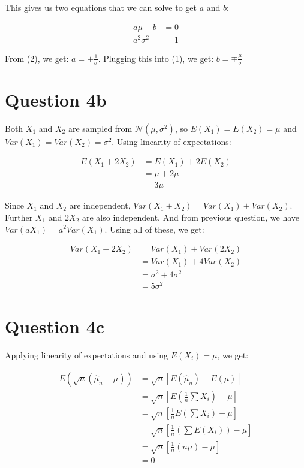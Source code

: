 \documentclass{article}
\begin{document}
    This gives us two equations that we can solve to get $a$ and $b$:

    \begin{align}
        a \mu + b           &= 0 \\
        a^{2} \sigma^{2}    &= 1
    \end{align}

    From (2), we get: $a = \pm \frac{1}{\sigma}$. Plugging this into (1), we get: $b = \mp \frac{\mu}{\sigma}$

    \section*{Question 4b}

    Both $X_1$ and $X_2$ are sampled from $\mathcal{N}(\mu, \sigma^{2})$, so $E(X_1) = E(X_2) = \mu$ and $Var(X_1) = Var(X_2) = \sigma^{2}$. Using linearity of expectations:

    \begin{align*}
        E(X_1 + 2X_2)   &= E(X_1) + 2E(X_2) \\
                        &= \mu + 2 \mu \\
                        &= 3 \mu
    \end{align*}

    Since $X_1$ and $X_2$ are independent, $Var(X_1 + X_2) = Var(X_1) + Var(X_2)$. Further $X_1$ and $2X_2$ are also independent. And from previous question, we have $Var(aX_1) = a^{2}Var(X_1)$. Using all of these, we get:

    \begin{align*}
        Var(X_1 + 2X_2) &= Var(X_1) + Var(2X_2) \\
                        &= Var(X_1) + 4Var(X_2) \\
                        &= \sigma^{2} + 4\sigma^{2} \\
                        &= 5\sigma^{2}
    \end{align*}

    \section*{Question 4c}

    Applying linearity of expectations and using $E(X_i) = \mu$, we get:

    \begin{align*}
        E(\sqrt{n}(\widehat{\mu}_{n} - \mu))    &= \sqrt{n}[E(\widehat{\mu}_{n}) - E(\mu)] \\
                                                &= \sqrt{n}[E(\frac{1}{n}\sum X_i) - \mu] \\
                                                &= \sqrt{n}[\frac{1}{n}E(\sum X_i) - \mu] \\
                                                &= \sqrt{n}[\frac{1}{n}(\sum E(X_i)) - \mu] \\
                                                &= \sqrt{n}[\frac{1}{n}(n \mu) - \mu] \\
                                                &= 0
    \end{align*}
\end{document}
